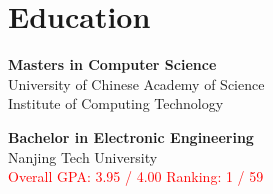 \documentclass[a4paper,10pt]{article}
\begin{document}
\begin{adjustbox}{valign=t}
\begin{minipage}{0.3\textwidth}
\vfill

\section*{Education}
	\begin{description}
	\raggedright

	\item [\normalfont \textcolor{ColorOne}{Aug. 2021 - Present}] \textbf{Masters in Computer Science}\\
	University of Chinese Academy of Science \\
	Institute of Computing Technology

	\item [\normalfont \textcolor{ColorOne}{Aug. 2017 - Jun. 2021}] \textbf{Bachelor in Electronic Engineering} \\ 
	Nanjing Tech University \\
	\textcolor{red}{Overall GPA:  3.95 / 4.00}
	\textcolor{red}{Ranking:  1 / 59}
	
\end{description}

\vfill
\end{minipage}
\end{adjustbox}
%
%
%
\hfill
\begin{adjustbox}{valign=t}
\begin{minipage}{0.05\textwidth} %
\MyVerticalRule  %
\end{minipage}
\end{adjustbox}
\hfill
%
\end{document}
